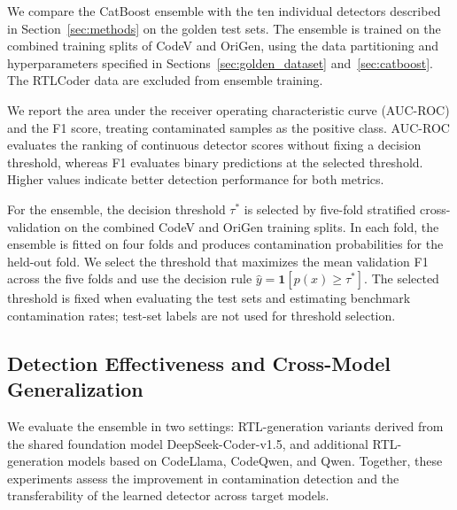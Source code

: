 We compare the CatBoost ensemble with the ten individual detectors described in Section~\ref{sec:methods} on the golden test sets. The ensemble is trained on the combined training splits of CodeV and OriGen, using the data partitioning and hyperparameters specified in Sections~\ref{sec:golden_dataset} and~\ref{sec:catboost}. The RTLCoder data are excluded from ensemble training.

We report the area under the receiver operating characteristic curve (AUC-ROC) and the F1 score, treating contaminated samples as the positive class. AUC-ROC evaluates the ranking of continuous detector scores without fixing a decision threshold, whereas F1 evaluates binary predictions at the selected threshold. Higher values indicate better detection performance for both metrics.

For the ensemble, the decision threshold \(\tau^*\) is selected by five-fold stratified cross-validation on the combined CodeV and OriGen training splits. In each fold, the ensemble is fitted on four folds and produces contamination probabilities for the held-out fold. We select the threshold that maximizes the mean validation F1 across the five folds and use the decision rule \(\hat{y}=\mathbf{1}[p(x)\geq\tau^*]\). The selected threshold is fixed when evaluating the test sets and estimating benchmark contamination rates; test-set labels are not used for threshold selection.


\subsection{Detection Effectiveness and Cross-Model Generalization}
\label{sec:performance}

We evaluate the ensemble in two settings: RTL-generation variants derived from the shared foundation model DeepSeek-Coder-v1.5, and additional RTL-generation models based on CodeLlama, CodeQwen, and Qwen. Together, these experiments assess the improvement in contamination detection and the transferability of the learned detector across target models.

